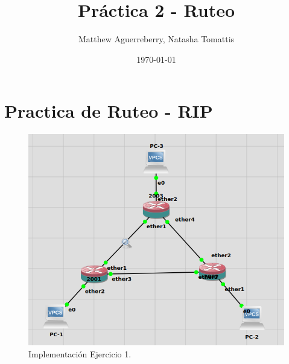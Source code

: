 \documentclass[letterpaper,12pt]{article}
\begin{document}
\title{Práctica 2 - Ruteo}
\author{Matthew Aguerreberry, Natasha Tomattis}
\date{\today}
\maketitle



\section{Practica de Ruteo - RIP}
\begin{figure}[ht] 
        
	\centering \includegraphics[width=0.8\columnwidth]{figure/topo.png}
	\caption{
			\label{fig:samplesetup} %
			Implementación Ejercicio 1.
	}
\end{figure}
\end{document}
